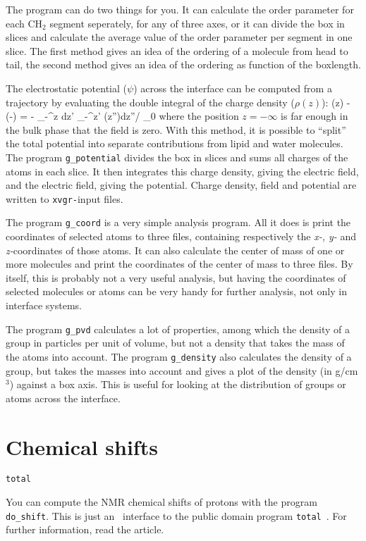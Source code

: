 The program can do two things for you. It can calculate the order
parameter for each CH$_2$ segment seperately, for any of three axes,
or it can divide the box in slices and calculate the average value of
the order parameter per segment in one slice. The first method gives
an idea of the ordering of a molecule from head to tail, the second
method gives an idea of the ordering as function of the boxlength.

The electrostatic potential ($\psi$) across the interface can be
computed from a trajectory by evaluating the double integral of the
charge density ($\rho(z)$):
\beq
\psi(z) - \psi(-\infty) = - \int_{-\infty}^z dz' \int_{-\infty}^{z'} \rho(z'')dz''/ \epsilon_0 
\label{eq:elpotgr}
\eeq
where the position $z=-\infty$ is far enough in the bulk phase that
the field is zero.  With this method, it is possible to ``split'' the
total potential into separate contributions from lipid and water
molecules. The program {\tt g\_potential} divides the box in slices and
sums all charges of the atoms in each slice. It then integrates this
charge density, giving the electric field, and the electric field,
giving the potential. Charge density, field and potential are written
to {\tt xvgr-}input files.

The program {\tt g\_coord} is a very simple analysis program. All it
does is print the coordinates of selected atoms to three files,
containing respectively the {\em x-, y-} and {\em z-}coordinates of
those atoms. It can also calculate the center of mass of one or more
molecules and print the coordinates of the center of mass to three
files. By itself, this is probably not a very useful analysis, but
having the coordinates of selected molecules or atoms can be very
handy for further analysis, not only in interface systems.

The program {\tt g\_pvd} calculates a lot of properties, among which
the density of a group in particles per unit of volume, but not a
density that takes the mass of the atoms into account. The program
{\tt g\_density} also calculates the density of a group, but takes the
masses into account and gives a plot of the density (in g/cm$^3$)
against a box axis. This is useful for looking at the distribution of
groups or atoms across the interface. 

%
%
\section{Chemical shifts}
\begin{verbatim}
total
\end{verbatim}
You can compute the NMR chemical shifts of protons with the program 
{\tt do\_shift}. This is just an \gromacs~interface to the public domain 
program 
{\tt total}~\cite{Williamson93a}. For further information, read the article.

%
%


